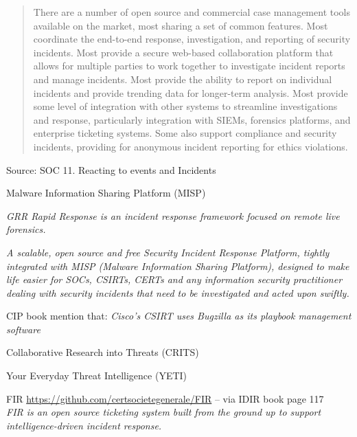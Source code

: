 \documentclass[Screen16to9,17pt]{foils}
\begin{document}


\begin{quote}
There are a number of open source and commercial case management tools available on the market, most sharing a set of common features. Most coordinate the end-to-end response, investigation, and reporting of security incidents. Most provide a secure web-based collaboration platform that allows for multiple parties to work together to investigate incident reports and manage incidents. Most provide the ability to report on individual incidents and provide trending data for longer-term analysis. Most provide some level of integration with other systems to streamline investigations and response, particularly integration with SIEMs, forensics platforms, and enterprise ticketing systems. Some also support compliance and security incidents, providing for anonymous incident reporting for ethics violations.
\end{quote}
Source:  SOC 11. Reacting to events and Incidents



\begin{list2}
  \item Malware Information Sharing Platform (MISP) 

  \item \emph{GRR Rapid Response is an incident response framework focused on remote live forensics.}

  \item \emph{A scalable, open source and free Security Incident Response Platform, tightly integrated with MISP (Malware Information Sharing Platform), designed to make life easier for SOCs, CSIRTs, CERTs and any information security practitioner dealing with security incidents that need to be investigated and acted upon swiftly.} 

\item CIP book mention that: \emph{Cisco’s CSIRT uses Bugzilla as its playbook management 
software}
\item Collaborative Research into Threats (CRITS)
\item Your Everyday Threat Intelligence (YETI)
\item FIR \url{https://github.com/certsocietegenerale/FIR} -- via IDIR book page 117\\
\emph{FIR is an open source ticketing system built from the
ground up to support intelligence-driven incident response.}
\end{list2}
\end{document}
